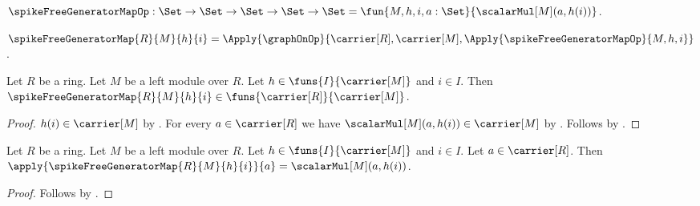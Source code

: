 \begin{definition}\label{spike_free_generator_map_op}
    $\spikeFreeGeneratorMapOp:
        \Set\to\Set\to\Set\to\Set\to\Set
        =\fun{M,h,i,a:\Set}{\scalarMul[M](a,h(i))}$.
\end{definition}

\begin{definition}\label{spike_free_generator_map}
    $\spikeFreeGeneratorMap{R}{M}{h}{i}
        =\Apply{\graphOnOp}{
            \carrier[R],\carrier[M],
            \Apply{\spikeFreeGeneratorMapOp}{M,h,i}}$.
\end{definition}

\begin{proposition}\label{spike_free_generator_map_type}
    Let $R$ be a ring.
    Let $M$ be a left module over $R$.
    Let $h\in\funs{I}{\carrier[M]}$ and $i\in I$.
    Then
        $\spikeFreeGeneratorMap{R}{M}{h}{i}
            \in\funs{\carrier[R]}{\carrier[M]}$.
\end{proposition}
\begin{proof}
    $h(i)\in\carrier[M]$ by .
    For every $a\in\carrier[R]$ we have
        $\scalarMul[M](a,h(i))\in\carrier[M]$ by
        .
    Follows by
        .
\end{proof}

\begin{proposition}\label{spike_free_generator_map_apply}
    Let $R$ be a ring.
    Let $M$ be a left module over $R$.
    Let $h\in\funs{I}{\carrier[M]}$ and $i\in I$.
    Let $a\in\carrier[R]$.
    Then
        $\apply{\spikeFreeGeneratorMap{R}{M}{h}{i}}{a}
            =\scalarMul[M](a,h(i))$.
\end{proposition}
\begin{proof}
    Follows by
        .
\end{proof}

